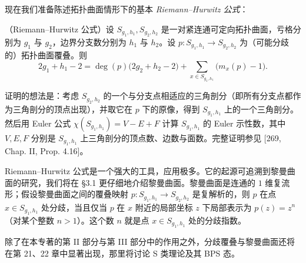 
现在我们准备陈述拓扑曲面情形下的基本 \emph{Riemann--Hurwitz 公式}：

\begin{theorem}[2.18]
（Riemann--Hurwitz 公式）设 $S_{g_1,h_1},S_{g_2,h_2}$ 是一对紧连通可定向拓扑曲面，亏格分别为 $g_1$ 与 $g_2$，边界分支数分别为 $h_1$ 与 $h_2$。设 $p\colon S_{g_1,h_1}\to S_{g_2,h_2}$ 为（可能分歧的）拓扑曲面覆叠。则
\[
2g_1+h_1-2=\deg(p)\bigl(2g_2+h_2-2\bigr)+\sum_{x\in S_{g_1,h_1}}\bigl(m_x(p)-1\bigr).
\]
\end{theorem}

证明的想法是：考虑 $S_{g_2,h_2}$ 的一个与分支点相适应的三角剖分（即所有分支点都作为三角剖分的顶点出现），并取它在 $p$ 下的原像，得到 $S_{g_1,h_1}$ 上的一个三角剖分。然后用 Euler 公式 $\chi(S_{g_1,h_1})=V-E+F$ 计算 $S_{g_1,h_1}$ 的 Euler 示性数，其中 $V,E,F$ 分别是 $S_{g_1,h_1}$ 上三角剖分的顶点数、边数与面数。完整证明参见 [269, Chap. II, Prop. 4.16]。

Riemann--Hurwitz 公式是一个强大的工具，应用极多。它的起源可追溯到黎曼曲面的研究，我们将在 §3.1 更仔细地介绍黎曼曲面。黎曼曲面是连通的 $1$ 维复流形；假设黎曼曲面之间的覆叠映射 $p\colon S_{g_1,h_1}\to S_{g_2,h_2}$ 是复解析的，则 $p$ 在点 $x\in S_{g_1,h_1}$ 处分歧，当且仅当 $p$ 在 $x$ 附近的局部坐标 $z$ 下局部表示为 $p(z)=z^n$（对某个整数 $n>1$）。这个数 $n$ 就是点 $x\in S_{g_1,h_1}$ 处的分歧指数。


除了在本专著的第 II 部分与第 III 部分中的作用之外，分歧覆叠与黎曼曲面还将在第 21、22 章中显著出现，那里将讨论 S 类理论及其 BPS 态。

